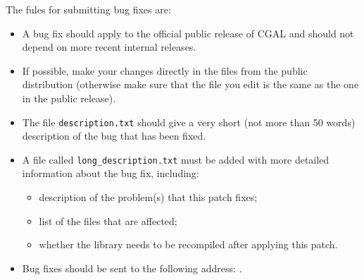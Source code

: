 The fules for submitting bug fixes are:
\begin{itemize}
   \item A bug fix should apply to the official public release of CGAL and 
         should not depend on more recent internal releases. 

   \item If possible, make your changes directly in the files from the public 
         distribution (otherwise make sure that the file you edit is the same
         as the one in the public release).

   \item The file {\tt description.txt}%
         should give a very short (not more
         than 50 words) description of the bug that has been fixed. 

   \item A file called {\tt long\_description.txt}
         must be added 
         with more detailed information about the bug fix, including: 
	 \begin{itemize}
            \item description of the problem(s) that this patch fixes;
            \item list of the files that are affected;
            \item whether the library needs to be recompiled after applying
	          this patch.
        \end{itemize}
   \item Bug fixes should be sent to the following address: 
         .
\end{itemize}

